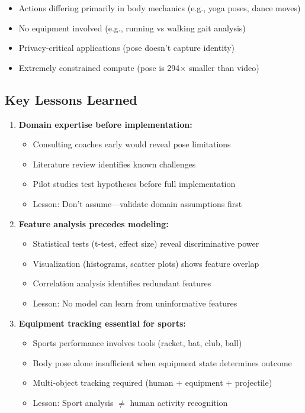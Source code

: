 \documentclass[11pt,a4paper]{article}
\begin{document}
\begin{itemize}
\item Actions differing primarily in body mechanics (e.g., yoga poses, dance moves)
\item No equipment involved (e.g., running vs walking gait analysis)
\item Privacy-critical applications (pose doesn't capture identity)
\item Extremely constrained compute (pose is 294× smaller than video)
\end{itemize}

\subsection{Key Lessons Learned}

\begin{enumerate}
\item \textbf{Domain expertise before implementation:}
   \begin{itemize}
   \item Consulting coaches early would reveal pose limitations
   \item Literature review identifies known challenges
   \item Pilot studies test hypotheses before full implementation
   \item Lesson: Don't assume---validate domain assumptions first
   \end{itemize}

\item \textbf{Feature analysis precedes modeling:}
   \begin{itemize}
   \item Statistical tests (t-test, effect size) reveal discriminative power
   \item Visualization (histograms, scatter plots) shows feature overlap
   \item Correlation analysis identifies redundant features
   \item Lesson: No model can learn from uninformative features
   \end{itemize}

\item \textbf{Equipment tracking essential for sports:}
   \begin{itemize}
   \item Sports performance involves tools (racket, bat, club, ball)
   \item Body pose alone insufficient when equipment state determines outcome
   \item Multi-object tracking required (human + equipment + projectile)
   \item Lesson: Sport analysis $\neq$ human activity recognition
   \end{itemize}


\end{enumerate}
\end{document}
